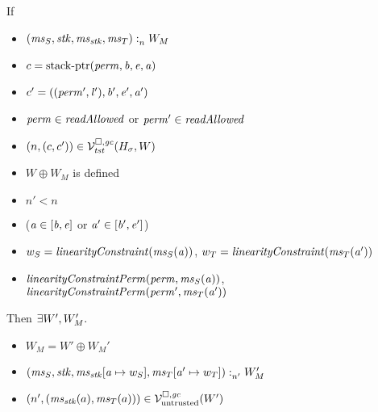 \begin{lemma}
  \label{lem:load-stack-cap-works}
  If
  \begin{itemize}
  \item $\memSat{(\ms_S,\stk,\ms_\stk,\ms_T)}{W_M}$
  \item $c = \stkptr{\perm,\baddr,\eaddr,\aaddr}$
  \item $c' = ((\perm',\lin'),\baddr',\eaddr',\aaddr')$
  \item $\perm \in \readAllowed{}$ or $\perm' \in \readAllowed{}$
  \item $\npair{(c,c')}\in\lrvg{\trust}(H_\sigma,W)$
  \item $W \oplus W_M$ is defined
  \item $n' < n$
  \item ($\aaddr \in [\baddr,\eaddr]$ or $\aaddr' \in [\baddr',\eaddr']$)
  \item $w_S = \linCons{\ms_S(\aaddr)}$, $w_T = \linCons{\ms_T(\aaddr')}$
  \item $\linConsPerm{\perm}{\ms_S(\aaddr)}$, $\linConsPerm{\perm'}{\ms_T(\aaddr')}$
  \end{itemize}
  Then $\exists W', W_M'\ldotp$
  \begin{itemize}
  \item $W_M = W' \oplus W_M'$
  \item $\memSat[n']{(\ms_S,\stk,\ms_\stk\update{\aaddr}{w_S},\ms_T\update{\aaddr'}{w_T})}{W_M'}$
  \item $\npair[n']{(\ms_\stk(a),\ms_T(a))} \in \lrv(W')$
  \end{itemize}
\end{lemma}
